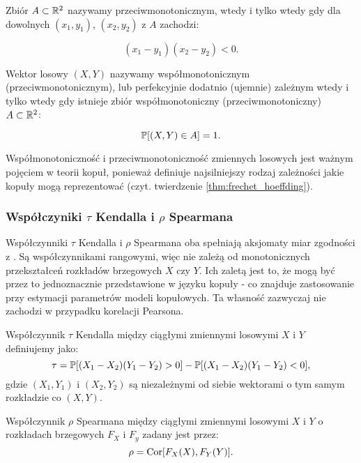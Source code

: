 \begin{df}
	Zbiór $A \subset \mathbb{R}^2$ nazywamy przeciwmonotonicznym, wtedy i tylko wtedy gdy dla dowolnych $(x_1, y_1)$, $(x_2, y_2)$ z $A$ zachodzi:
	
	$$ (x_1 - y_1)(x_2 - y_2) <0.$$
\end{df}


\begin{df}
	Wektor losowy $(X, Y)$ nazywamy współmonotonicznym (przeciwmonotonicznym), lub perfekcyjnie dodatnio (ujemnie) zależnym wtedy i tylko wtedy gdy istnieje zbiór współmonotoniczny (przeciwmonotoniczny) $A\subset\mathbb{R}^2$:
	
	$$ \mathbb{P}[(X,Y)\in A]=1.$$
\end{df}

Współmonotoniczność i przeciwmonotoniczność zmiennych losowych jest ważnym pojęciem w teorii kopuł, ponieważ definiuje najsilniejszy rodzaj zależności jakie kopuły mogą reprezentować (czyt. twierdzenie \ref{thm:frechet_hoeffding}).

\subsubsection{Współczyniki $\tau$ Kendalla i $\rho$ Spearmana}

Współczynniki $\tau$ Kendalla i $\rho$ Spearmana oba spełniają aksjomaty miar zgodności z \cite{Scarsini1984}. Są współczynnikami rangowymi, więc nie zależą od monotonicznych przekształceń rozkładów brzegowych $X$ czy $Y$. Ich zaletą jest to, że mogą być przez to jednoznacznie przedstawione w języku kopuły - co znajduje zastosowanie przy estymacji parametrów modeli kopułowych. Ta własność zazwyczaj nie zachodzi w przypadku korelacji Pearsona.

\begin{df}
	Współczynnik $\tau$ Kendalla między ciągłymi zmiennymi losowymi $X$ i $Y$ definiujemy jako:
	$$ \tau = \mathbb{P}[(X_1-X_2)(Y_1-Y_2)>0] - \mathbb{P}[(X_1-X_2)(Y_1-Y_2) <0], $$
	gdzie $(X_1, Y_1)$ i $(X_2, Y_2)$ są niezależnymi od siebie wektorami o tym samym rozkładzie co $(X, Y)$.
\end{df}

\begin{df}
	Współczynnik $\rho$ Spearmana między ciągłymi zmiennymi losowymi $X$ i $Y$ o rozkładach brzegowych $F_X$ i $F_y$ zadany jest przez:
	$$ \rho = \text{Cor}[F_X(X), F_Y(Y)].$$
\end{df}

